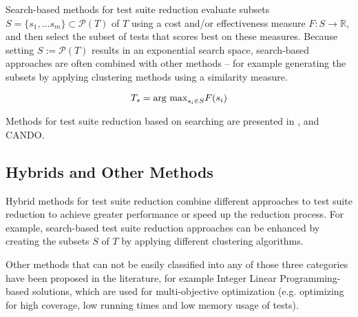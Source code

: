 Search-based methods for test suite reduction evaluate subsets
$S=\{s_1, \dots s_m\} \subset \mathcal{P}(T)$ of $T$ using a cost
and/or effectiveness measure $F: S \rightarrow \mathbb{R}$, and then
select the subset of tests that scores best on these measures. Because
setting $S:=\mathcal{P}(T)$ results in an exponential search space,
search-based approaches are often combined with other methods – for
example generating the subsets by applying clustering methods using a
similarity measure.

$$T_s=\hbox{arg max}_{s_i \in S} F(s_i)$$

Methods for test suite reduction based on searching are presented in
\cite{coutinho2013test}, and CANDO.

\subsection{Hybrids and Other Methods}

Hybrid methods for test suite reduction combine different approaches
to test suite reduction to achieve greater performance or speed up
the reduction process. For example, search-based test suite reduction
approaches can be enhanced by creating the subsets $S$ of $T$ by applying
different clustering algorithms.

Other methods that can not be easily classified into any of those three
categories have been proposed in the literature, for example Integer
Linear Programming-based solutions, which are used for multi-objective
optimization (e.g. optimizing for high coverage, low running times and
low memory usage of tests). %

